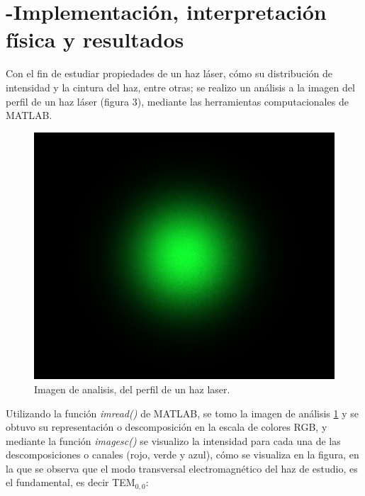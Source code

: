 \documentclass[11pt,letterpaper,twocolumn]{article}
\begin{document}
\section*{-Implementación, interpretación física y resultados}
Con el fin de estudiar propiedades de un haz láser, cómo su distribución de intensidad y la cintura del haz, entre otras; se realizo un análisis a la imagen del perfil de un haz láser (figura $3$), mediante las herramientas computacionales de MATLAB.\\
\begin{figure}[h!]
\begin{center}
\includegraphics[scale=0.15]{green-laser-2.JPG}
\caption{Imagen de analisis, del perfil de un haz laser.}
\end{center}
\label{ima}
\end{figure}
\par 
Utilizando la función \textit{imread()} de MATLAB, se tomo la imagen de análisis \ref{ima} y se obtuvo su representación o descomposición en la escala de colores RGB, y mediante la función \textit{imagesc()} se visualizo la intensidad para cada una de las descomposiciones o canales (rojo, verde y azul), cómo se visualiza en la figura, en la que se observa que el modo transversal electromagnético del haz de estudio, es el fundamental, es decir TEM$_{0,0}$:
\end{document}

